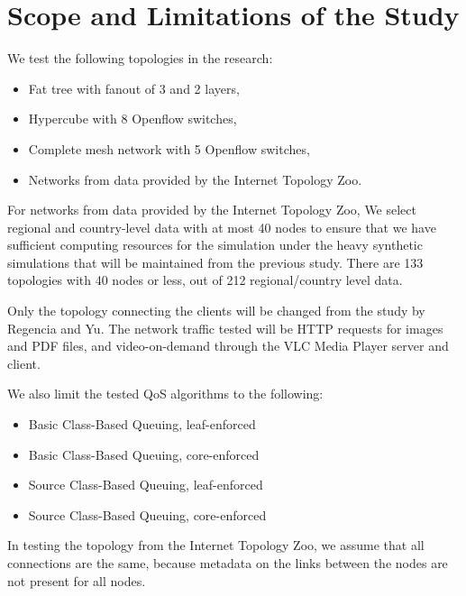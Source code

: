 \section{Scope and Limitations of the Study}

We test the following topologies in the research:
\begin{itemize}
    \item Fat tree with fanout of 3 and 2 layers,
    \item Hypercube with 8 Openflow switches,
    \item Complete mesh network with 5 Openflow switches,
    \item Networks from data provided by the Internet Topology Zoo.
\end{itemize}

For networks from data provided by the Internet Topology Zoo, We select regional and country-level data with at most 40 nodes to ensure that we have sufficient computing resources for the simulation under the heavy synthetic simulations that will be maintained from the previous study. There are 133 topologies with 40 nodes or less, out of 212 regional/country level data. 

Only the topology connecting the clients will be changed from the study by Regencia and Yu. The network traffic tested will be HTTP requests for images and PDF files, and video-on-demand through the VLC Media Player server and client.
    
We also limit the tested QoS algorithms to the following:
\begin{itemize}
    \item Basic Class-Based Queuing, leaf-enforced
    \item Basic Class-Based Queuing, core-enforced
    \item Source Class-Based Queuing, leaf-enforced
    \item Source Class-Based Queuing, core-enforced
\end{itemize}

In testing the topology from the Internet Topology Zoo, we assume that all connections are the same, because metadata on the links between the nodes are not present for all nodes.